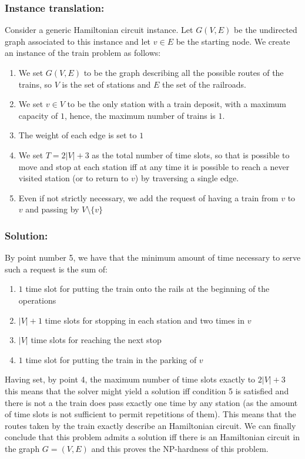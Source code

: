 \documentclass[11pt]{article}
\begin{document}
\subsubsection{Instance translation: }
Consider a generic Hamiltonian circuit instance. Let $G(V,E)$ be the undirected graph associated to this instance and 
let $v \in E$ be the starting node. We create an instance of the train problem as follows:
\begin{enumerate}
\item We set $G(V,E)$ to be the graph describing all the possible routes of the trains, so $V$ is the set of stations and $E$ the set of the railroads.
\item We set $v\in V$ to be the only station with a train deposit, with a maximum capacity of $1$, hence, the maximum number of trains is $1$.
\item The weight of each edge is set to $1$
\item We set $T=2|V|+3$ as the total number of time slots, so that is possible to move and stop at each station iff at any time it is possible to reach a never visited station (or to return to $v$) by traversing a single edge.   
\item Even if not strictly necessary, we add the request of having a train from $v$ to $v$ and passing by $V\setminus \{v\}$
\end{enumerate}
\subsubsection{Solution:}
By point number 5, we have that the minimum amount of time necessary to serve such a request is the sum of:
\begin{enumerate}
\item $1$ time slot for putting the train onto the rails at the beginning of the operations
\item $|V|+1$ time slots for stopping in each station and two times in $v$
\item $|V|$ time slots for reaching the next stop 
\item $1$ time slot for putting the train in the parking of $v$
\end{enumerate}
Having set, by point 4, the maximum number of time slots exactly to $2|V|+3$ this means that the solver might yield a solution iff condition 5 is satisfied and there is not a the train does pass exactly one time by any station (as the amount of time slots is not sufficient to permit repetitions of them). This means that the routes taken by the train exactly describe an Hamiltonian circuit.
We can finally conclude that this problem admits a solution iff there is an Hamiltonian circuit in the graph $G=(V,E)$ and this proves the NP-hardness of this problem.
\end{document}
